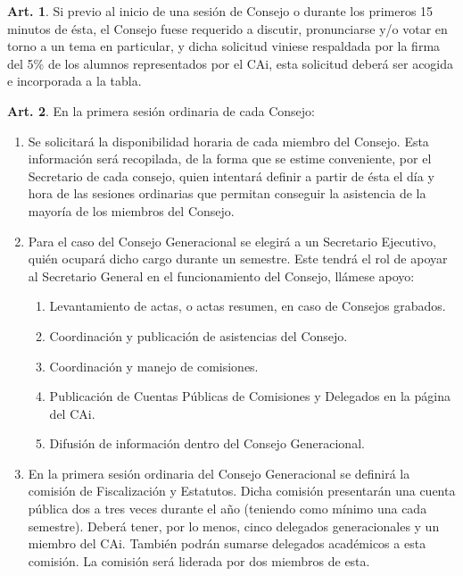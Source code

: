 \documentclass[letterpaper,11pt]{article}
\theoremstyle{definition}%
\newtheorem{art}{Art.} %
\begin{document}
\begin{art}\label{temaPropuestoAlumnado}
	Si previo al inicio de una sesión de Consejo o durante los primeros 15 minutos de ésta, el Consejo fuese requerido a discutir, pronunciarse y/o votar en torno a un tema en particular, y dicha solicitud viniese respaldada por la firma del 5\% de los alumnos representados por el CAi, esta solicitud deberá ser acogida e incorporada a la tabla.
\end{art}

\begin{art}\label{fijarAsistencias}
	En la primera sesión ordinaria de cada Consejo:
	\begin{enumerate}
		\item Se solicitará la disponibilidad horaria de cada miembro del Consejo. Esta información será recopilada, de la forma que se estime conveniente, por el Secretario de cada consejo, quien intentará definir a partir de ésta el día y hora de las sesiones ordinarias que permitan conseguir la asistencia de la mayoría de los miembros del Consejo.

		\item Para el caso del Consejo Generacional se elegirá a un Secretario Ejecutivo, quién ocupará dicho cargo durante un semestre. Este tendrá el rol de apoyar al Secretario General en el funcionamiento del Consejo, llámese apoyo:
		      \begin{enumerate}
			      \item Levantamiento de actas, o actas resumen, en caso de Consejos grabados.
			      \item Coordinación y publicación de asistencias del Consejo.
			      \item Coordinación y manejo de comisiones.
			      \item Publicación de Cuentas Públicas de Comisiones y Delegados en la página del CAi.
			      \item Difusión de información dentro del Consejo Generacional.
		      \end{enumerate}

		\item En la primera sesión ordinaria del Consejo Generacional se definirá la comisión de Fiscalización y Estatutos. Dicha comisión presentarán una cuenta pública dos a tres veces durante el año (teniendo como mínimo una cada semestre). Deberá tener, por lo menos, cinco delegados generacionales y un miembro del CAi. También podrán sumarse delegados académicos a esta comisión. La comisión será liderada por dos miembros de esta.
	\end{enumerate}
\end{art}
\end{document}
